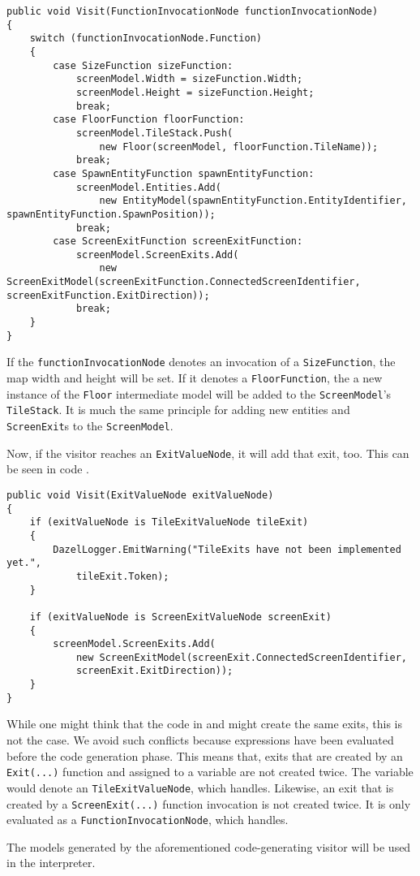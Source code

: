 \begin{lstlisting}[language=CSharp, caption={FunctionInvocationNode \texttt{Visit} method.}, label={lst:finVisitSG}]
public void Visit(FunctionInvocationNode functionInvocationNode)
{
    switch (functionInvocationNode.Function)
    {
        case SizeFunction sizeFunction:
            screenModel.Width = sizeFunction.Width;
            screenModel.Height = sizeFunction.Height;
            break;
        case FloorFunction floorFunction:
            screenModel.TileStack.Push(
                new Floor(screenModel, floorFunction.TileName));
            break;
        case SpawnEntityFunction spawnEntityFunction:
            screenModel.Entities.Add(
                new EntityModel(spawnEntityFunction.EntityIdentifier, spawnEntityFunction.SpawnPosition));
            break;
        case ScreenExitFunction screenExitFunction:
            screenModel.ScreenExits.Add(
                new ScreenExitModel(screenExitFunction.ConnectedScreenIdentifier, screenExitFunction.ExitDirection));
            break;
    }
}    
\end{lstlisting}

If the \texttt{functionInvocationNode} denotes an invocation of a \texttt{SizeFunction}, the map width and height will be set. If it denotes a \texttt{FloorFunction}, the a new instance of the \texttt{Floor} intermediate model will be added to the \texttt{ScreenModel}'s \texttt{TileStack}. It is much the same principle for adding new entities and \texttt{ScreenExit}s to the \texttt{ScreenModel}.

Now, if the visitor reaches an \texttt{ExitValueNode}, it will add that exit, too. This can be seen in code .

\begin{lstlisting}[label={lst:visitExitNodeSG}, caption={The visit method for \textbf{ExitValueNode.}}, language=CSharp]
public void Visit(ExitValueNode exitValueNode)
{
    if (exitValueNode is TileExitValueNode tileExit)
    {
        DazelLogger.EmitWarning("TileExits have not been implemented yet.", 
            tileExit.Token);
    }

    if (exitValueNode is ScreenExitValueNode screenExit)
    {
        screenModel.ScreenExits.Add(
            new ScreenExitModel(screenExit.ConnectedScreenIdentifier, 
            screenExit.ExitDirection));
    }
}
\end{lstlisting}

While one might think that the code in  and  might create the same exits, this is not the case. We avoid such conflicts because expressions have been evaluated before the code generation phase. This means that, exits that are created by an \texttt{Exit(...)} function and assigned to a variable are not created twice. The variable would denote an \texttt{TileExitValueNode}, which  handles. Likewise, an exit that is created by a \texttt{ScreenExit(...)} function invocation is not created twice. It is only evaluated as a \texttt{FunctionInvocationNode}, which  handles.


The models generated by the aforementioned code-generating visitor will be used in the \dazel{} interpreter.